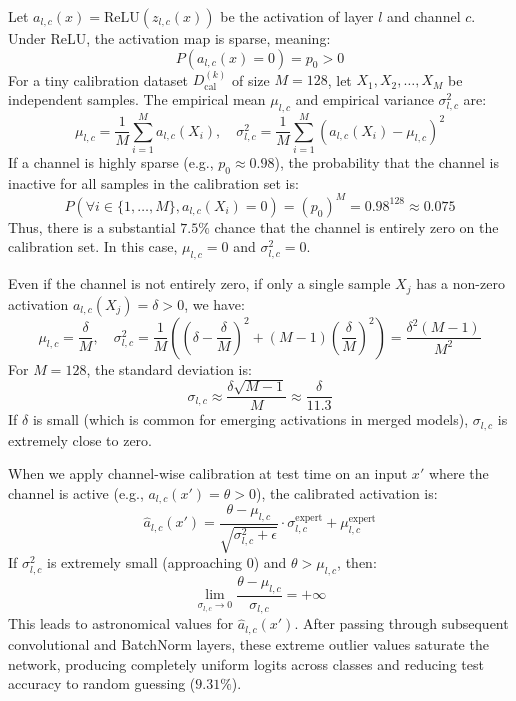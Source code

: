 \documentclass{article}
\theoremstyle{plain}
\theoremstyle{definition}
\theoremstyle{remark}
\begin{document}
Let $a_{l,c}(x) = \text{ReLU}(z_{l,c}(x))$ be the activation of layer $l$ and channel $c$. Under ReLU, the activation map is sparse, meaning:
\begin{equation}
  P(a_{l,c}(x) = 0) = p_0 > 0
\end{equation}
For a tiny calibration dataset $D_{\text{cal}}^{(k)}$ of size $M = 128$, let $X_1, X_2, \dots, X_M$ be independent samples. The empirical mean $\mu_{l,c}$ and empirical variance $\sigma^2_{l,c}$ are:
\begin{equation}
  \mu_{l,c} = \frac{1}{M}\sum_{i=1}^M a_{l,c}(X_i), \quad \sigma^2_{l,c} = \frac{1}{M}\sum_{i=1}^M (a_{l,c}(X_i) - \mu_{l,c})^2
\end{equation}
If a channel is highly sparse (e.g., $p_0 \approx 0.98$), the probability that the channel is inactive for all samples in the calibration set is:
\begin{equation}
  P(\forall i \in \{1,\dots,M\}, a_{l,c}(X_i) = 0) = (p_0)^M = 0.98^{128} \approx 0.075
\end{equation}
Thus, there is a substantial $7.5\%$ chance that the channel is entirely zero on the calibration set. In this case, $\mu_{l,c} = 0$ and $\sigma^2_{l,c} = 0$.

Even if the channel is not entirely zero, if only a single sample $X_j$ has a non-zero activation $a_{l,c}(X_j) = \delta > 0$, we have:
\begin{equation}
  \mu_{l,c} = \frac{\delta}{M}, \quad \sigma^2_{l,c} = \frac{1}{M} \left( \left(\delta - \frac{\delta}{M}\right)^2 + (M-1)\left(\frac{\delta}{M}\right)^2 \right) = \frac{\delta^2(M-1)}{M^2}
\end{equation}
For $M=128$, the standard deviation is:
\begin{equation}
  \sigma_{l,c} \approx \frac{\delta \sqrt{M-1}}{M} \approx \frac{\delta}{11.3}
\end{equation}
If $\delta$ is small (which is common for emerging activations in merged models), $\sigma_{l,c}$ is extremely close to zero.

When we apply channel-wise calibration at test time on an input $x'$ where the channel is active (e.g., $a_{l,c}(x') = \theta > 0$), the calibrated activation is:
\begin{equation}
  \hat{a}_{l,c}(x') = \frac{\theta - \mu_{l,c}}{\sqrt{\sigma_{l,c}^2 + \epsilon}} \cdot \sigma_{l,c}^{\text{expert}} + \mu_{l,c}^{\text{expert}}
\end{equation}
If $\sigma_{l,c}^2$ is extremely small (approaching 0) and $\theta > \mu_{l,c}$, then:
\begin{equation}
  \lim_{\sigma_{l,c} \to 0} \frac{\theta - \mu_{l,c}}{\sigma_{l,c}} = + \infty
\end{equation}
This leads to astronomical values for $\hat{a}_{l,c}(x')$. After passing through subsequent convolutional and BatchNorm layers, these extreme outlier values saturate the network, producing completely uniform logits across classes and reducing test accuracy to random guessing ($9.31\%$).
\end{document}

